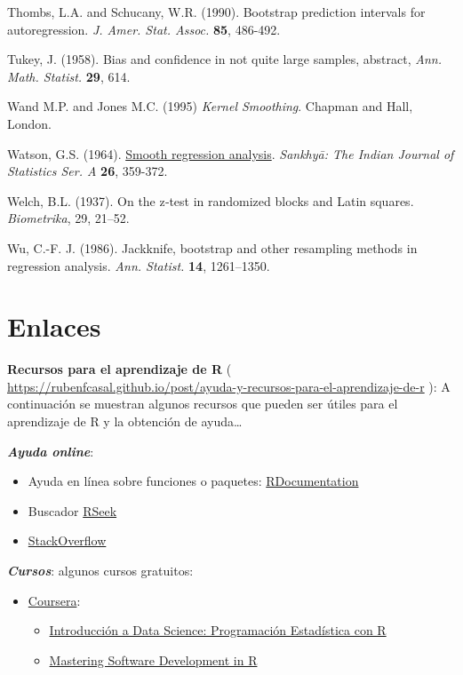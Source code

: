 \documentclass[]{book}
\theoremstyle{break}
\theoremstyle{definition}
\theoremstyle{definition}
\theoremstyle{definition}
\theoremstyle{remark}
\begin{document}
Thombs, L.A. and Schucany, W.R. (1990). Bootstrap prediction intervals
for autoregression. \emph{J. Amer. Stat. Assoc.} \textbf{85}, 486-492.

Tukey, J. (1958). Bias and confidence in not quite large samples,
abstract, \emph{Ann. Math. Statist.} \textbf{29}, 614.

Wand M.P. and Jones M.C. (1995) \emph{Kernel Smoothing}. Chapman and
Hall, London.

Watson, G.S. (1964).
\href{https://www.jstor.org/stable/25049340?seq=1\#page_scan_tab_contents}{Smooth
regression analysis}. \emph{Sankhy{ā}: The Indian Journal of Statistics
Ser. A} \textbf{26}, 359-372.

Welch, B.L. (1937). On the z‐test in randomized blocks and Latin
squares. \emph{Biometrika}, 29, 21--52.

Wu, C.-F. J. (1986). Jackknife, bootstrap and other resampling methods
in regression analysis. \emph{Ann. Statist.} \textbf{14}, 1261--1350.

\appendix


\chapter{Enlaces}\label{links}

\textbf{Recursos para el aprendizaje de R} (
\url{https://rubenfcasal.github.io/post/ayuda-y-recursos-para-el-aprendizaje-de-r}
): A continuación se muestran algunos recursos que pueden ser útiles
para el aprendizaje de R y la obtención de ayuda\ldots{}

\textbf{\emph{Ayuda online}}:

\begin{itemize}
\item
  Ayuda en línea sobre funciones o paquetes:
  \href{https://www.rdocumentation.org/}{RDocumentation}
\item
  Buscador \href{http://rseek.org/}{RSeek}
\item
  \href{http://stackoverflow.com/questions/tagged/r}{StackOverflow}
\end{itemize}

\textbf{\emph{Cursos}}: algunos cursos gratuitos:

\begin{itemize}
\item
  \href{https://www.coursera.org/}{Coursera}:

  \begin{itemize}
  \item
    \href{https://www.coursera.org/learn/intro-data-science-programacion-estadistica-r}{Introducción
    a Data Science: Programación Estadística con R}
  \item
    \href{https://www.coursera.org/specializations/r}{Mastering Software
    Development in R}
  \end{itemize}
\end{itemize}
\end{document}

